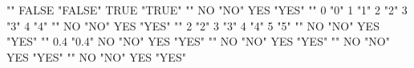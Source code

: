 \documentclass{article}\usepackage[]{graphicx}\usepackage[]{color}
\begin{document}
                                    ""                                   
FALSE                               "FALSE"                              
TRUE                                "TRUE"                               
                                    ""                                   
NO                                  "NO"                                 
YES                                 "YES"                                
                                    ""                                   
0                                   "0"                                  
1                                   "1"                                  
2                                   "2"                                  
3                                   "3"                                  
4                                   "4"                                  
                                    ""                                   
NO                                  "NO"                                 
YES                                 "YES"                                
                                    ""                                   
2                                   "2"                                  
3                                   "3"                                  
4                                   "4"                                  
5                                   "5"                                  
                                    ""                                   
NO                                  "NO"                                 
YES                                 "YES"                                
                                    ""                                   
0.4                                 "0.4"                                
NO                                  "NO"                                 
YES                                 "YES"                                
                                    ""                                   
NO                                  "NO"                                 
YES                                 "YES"                                
                                    ""                                   
NO                                  "NO"                                 
YES                                 "YES"                                
                                    ""                                   
NO                                  "NO"                                 
YES                                 "YES"                                
\end{document}
